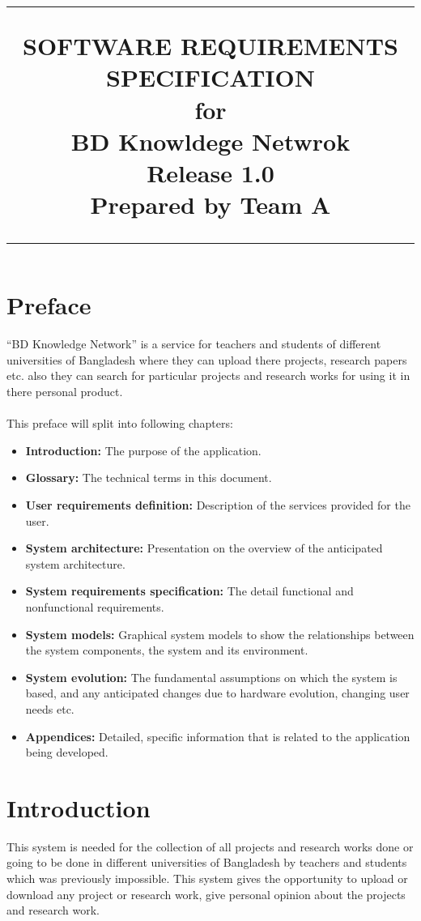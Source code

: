 \documentclass{scrreprt}
\title{%
\flushright
\rule{16cm}{5pt}\vskip1cm
\Huge{SOFTWARE REQUIREMENTS\\ SPECIFICATION}\\
\vspace{2cm}
for\\
\vspace{2cm}
BD Knowldege Netwrok\\
\vspace{2cm}
\LARGE{Release 1.0\\}
\vspace{4cm}
Prepared by Team A\\
\vfill
\rule{16cm}{5pt}
}
\date{}
\begin{document}
\cfoot{\thepage}
\maketitle
\tableofcontents
\chapter*{Preface}
“BD Knowledge Network”  is a service  for teachers and students of different universities of  Bangladesh where  they  can  upload  there projects, research papers etc. also they can search for particular projects and research works for using it in there personal product.\\\\
This preface will split into following chapters:\\
\begin{itemize}
\item \textbf{Introduction:}  The purpose of the application.
\item \textbf{Glossary:} The technical terms in this document.
\item \textbf{User requirements definition:} Description of the services provided for the user.
\item \textbf{System architecture:} Presentation on the overview of the anticipated system architecture.
\item \textbf{System requirements specification:}  The detail functional and nonfunctional requirements.
\item \textbf{System models:} Graphical system models to show the relationships between the system components, the system and its environment.
\item \textbf{System evolution:} The fundamental assumptions on which the system is based, and any anticipated changes due to hardware evolution, changing user needs etc.
\item \textbf{Appendices:} Detailed, specific information that is related to the application being developed.
\end{itemize}
\chapter{Introduction}
This system is needed for the collection of all projects and research works done or going to be done in different universities of Bangladesh by teachers and students which was previously impossible. This system gives the opportunity to upload or download any project or research work, give personal opinion about the projects and research work.
\end{document}
